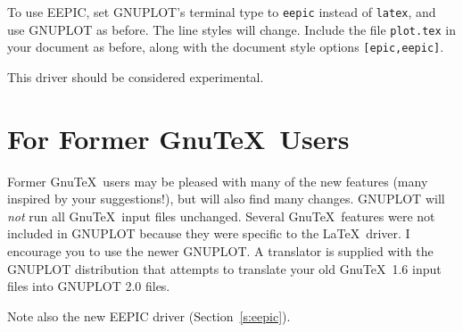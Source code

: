 To use EEPIC, set GNUPLOT's terminal type to {\tt eepic} instead of
{\tt latex}, and use GNUPLOT as before. The line styles will change.
Include the file {\tt plot.tex} in your document as before, along with
the document style options {\tt [epic,eepic]}.

This driver should be considered experimental.

\section{For Former Gnu\TeX\ Users}
\label{oldusers}

Former Gnu\TeX\ users may be pleased with many of the new features
(many inspired by your suggestions!), but will also find many changes.
GNUPLOT will {\em not\/} run all Gnu\TeX\ input files unchanged.
Several Gnu\TeX\ features were not included in GNUPLOT because they
were specific to the \LaTeX\ driver. I encourage you to use the newer
GNUPLOT.  A translator is supplied with the GNUPLOT distribution that
attempts to translate your old Gnu\TeX\ 1.6 input files into GNUPLOT
2.0 files.

Note also the new EEPIC driver (Section~\ref{s:eepic}).

